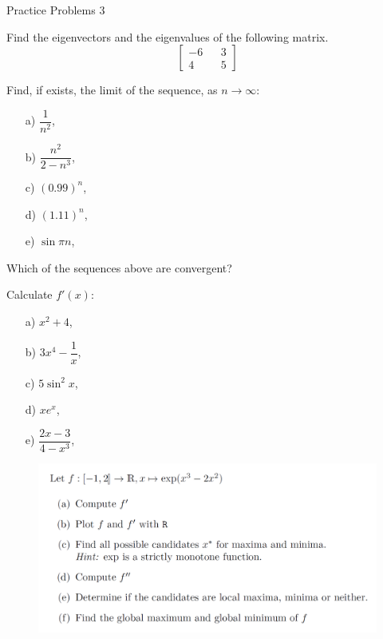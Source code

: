  \begin{center}\begin{large} Practice Problems 3
 \end{large}\end{center}

\begin{problem}
    Find the eigenvectors and the eigenvalues of the following matrix.
    \[
    \begin{bmatrix}
        -6 && 3 \\
        4 && 5
    \end{bmatrix}
    \]
\end{problem}

\begin{problem}
   Find, if exists, the limit of the sequence, as $n\to\infty$:

    \begin{enumerate}
        \item[a) ] $\dfrac{1}{n^2}$,
        \item[b) ] $\dfrac{n^2}{2-n^3}$,
        \item[c) ] $(0.99)^n$,
        \item[d) ] $(1.11)^n$,
        \item[e) ] $\sin {\pi n}$,


    \end{enumerate}
    Which of the sequences above are convergent?
\end{problem}

\begin{problem}
Calculate $f'(x)$:
    \begin{enumerate}
        \item[a) ] $x^2+4 $,
        \item[b) ] $3x^4-\dfrac{1}{x}$,
        \item[c) ] $5\sin^2 x$,
        \item[d) ] $xe^x$,
        \newpage
        \item[e) ] $\dfrac{2x-3}{4-x^3}$,
    \end{enumerate}
\end{problem}

\begin{problem}
    \begin{figure}
        \centering
        \includegraphics[width=1\linewidth]{figs/critical_points.png}
    \end{figure}
\end{problem}

